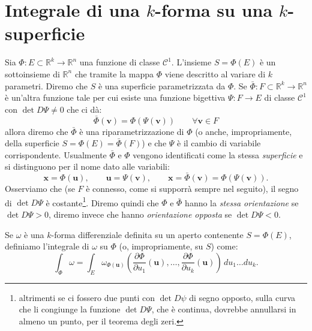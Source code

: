 \documentclass[italian,a4paper]{scrartcl}
\newcommand{\RR}{{\mathbb R}}
\newcommand{\defeq}{=}
\renewcommand{\vec}{\mathbf}
\begin{document}
\section{Integrale di una $k$-forma su una $k$-superficie}

Sia $\Phi\colon E\subset \RR^k\to \RR^n$ una funzione di classe
$\mathcal C^1$. L'insieme $S=\Phi(E)$ è un sottoinsieme di $\RR^n$ che
tramite la mappa $\Phi$ viene descritto al variare di $k$
parametri. Diremo che $S$ è una superficie parametrizzata da
$\Phi$. Se $\bar \Phi \colon F\subset \RR^k\to \RR^n$ è un'altra
funzione tale per cui esiste una funzione bigettiva $\Psi\colon F\to
E$ di classe $\mathcal C^1$ con $\det D\Psi \neq 0$
che ci dà:
\[
  \bar \Phi(\vec v) = \Phi(\Psi(\vec v)) \qquad \forall \vec v\in F
\]
allora diremo che $\bar \Phi$ è una riparametrizzazione di $\Phi$ (o
anche, impropriamente, della superficie $S=\Phi(E) = \bar\Phi(F)$) e
che $\Psi$ è il cambio di variabile corrispondente. Usualmente $\bar
\Phi$ e $\Phi$ vengono identificati come la stessa \emph{superficie} e
si distinguono per il nome dato alle variabili:
\[
  \vec x = \Phi(\vec u), \qquad \vec u = \Psi(\vec v), \qquad \vec x =
  \bar \Phi (\vec v) = \Phi(\Psi(\vec v)).
\]
Osserviamo che (se $F$ è connesso, come si supporrà sempre nel
seguito), il segno di $\det D\Psi$ è costante\footnote{altrimenti se ci
fossero due punti con $\det D\psi$ di segno opposto, 
sulla curva che li congiunge la
funzione $\det D\Psi$, che è continua, dovrebbe annullarsi in almeno
un punto, per il teorema degli zeri.}. Diremo quindi che $\Phi$ e
$\bar \Phi$ hanno la \emph{stessa orientazione} se $\det D\Psi>0$,
diremo invece che hanno \emph{orientazione opposta} se $\det D\Psi<0$.

Se $\omega$ è una $k$-forma differenziale definita su un aperto contenente
$S=\Phi(E)$, definiamo l'integrale di $\omega$ su $\Phi$ (o,
impropriamente, su $S$) come:
\[
\int_\Phi \omega \defeq \int_E \omega_{\Phi(\vec u)}\left(\frac{\partial
  \Phi}{\partial u_1}(\vec u), \dots, \frac{\partial \Phi}{\partial
  u_k}(\vec u)\right)\, du_1 \dots du_k. 
\]
\end{document}
